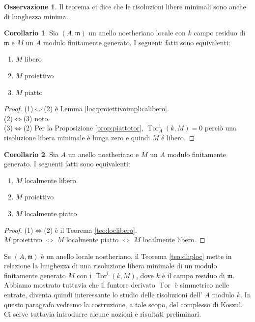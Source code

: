 \documentclass[a4paper,11pt,oneside]{book}
\newcommand{\m}{\mathfrak{m}}
\DeclareMathOperator{\Tor}{Tor}
\theoremstyle{definition}
\newtheorem{cor}{Corollario}
\newtheorem{oss}[section]{Osservazione}
\begin{document}
  \begin{oss}
   Il teorema ci dice che le risoluzioni libere minimali sono anche di lunghezza minima.
  \end{oss}

  \begin{cor}
   Sia $(A,\m)$ un anello noetheriano locale con $k$ campo residuo di $\m$ e $M$ un $A$ modulo finitamente generato. I seguenti fatti sono equivalenti:
   \begin{enumerate}[(1)]
    \item $M$ libero
    \item $M$ proiettivo
    \item $M$ piatto
   \end{enumerate}
  \end{cor}
  \begin{proof}
  
   (1)$\iff$(2) \`e Lemma \ref{loc:proiettivoimplicalibero}.\\
   (2)$\iff$(3) noto.\\
   (3)$\iff$(2) Per la Proposizione \ref{prop:piattotor}, $\Tor^1_A(k,M)=0$ perciò una risoluzione libera minimale \`e lunga zero e quindi $M$ \'e libero.
  \end{proof}
   
  \begin{cor}
   Sia $A$ un anello noetheriano e $M$ un $A$ modulo finitamente generato.
   I seguenti fatti sono equivalenti:
   \begin{enumerate}[(1)]
    \item $M$ localmente libero.
    \item $M$ proiettivo
    \item $M$ localmente piatto
   \end{enumerate}
  \end{cor}
  \begin{proof}(1)$\iff$(2) \`e  il Teorema \ref{teo:loclibero}.\\
  $M$ proiettivo $\iff$ $M$ localmente piatto $\iff$ $M$ localmente libero.
  \end{proof}

   Se $(A,\m)$ è un anello locale noetheriano, il Teorema \ref{teo:dhploc} mette in relazione la lunghezza di 
   una risoluzione libera minimale di un modulo
   finitamente generato $M$ con i $\Tor^i (k,M)$, dove $k$ è il campo residuo di $\m$. Abbiamo mostrato tuttavia che
   il funtore derivato $\Tor$ è simmetrico nelle entrate, diventa quindi interessante lo studio delle risoluzioni dell' $A$ modulo $k$.
   In questo paragrafo vedremo la costruzione, a tale scopo, del complesso di Koszul. Ci serve tuttavia introdurre alcune nozioni e risultati
   preliminari.\\
   
\end{document}
